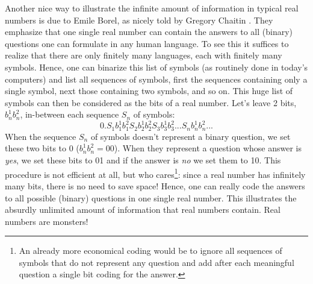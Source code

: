 \documentclass[pra,aps,groupedaddress,twocolumn,floatfix,nofootinbib]{revtex4}
\newcommand{\beq}{\begin{equation}}
\newcommand{\eeq}{\end{equation}}
\begin{document}
Another nice way to illustrate the infinite amount of information in typical real numbers is due to Emile Borel, as nicely told by Gregory Chaitin \cite{Chaitin}. They emphasize that one single real number can contain the answers to all (binary) questions one can formulate in any human language. To see this it suffices to realize that there are only finitely many languages, each with finitely many symbols. Hence,  one can binarize this list of symbols (as routinely done in today's computers) and list all sequences of symbols, first the sequences containing only a single symbol, next those containing two symbols, and so on. This huge list of symbols can then be considered as the bits of a real number. Let's leave 2 bits, $b_n^1b_n^2$, in-between each sequence $S_n$ of symbols:
\beq
0.S_1b_1^1b_1^2S_2b_2^1b_2^2S_3b_3^1b_3^2...S_nb_n^1b_n^2...
\eeq
When the sequence $S_n$ of symbols doesn't represent a binary question, we set these two bits to 0 ($b_n^1b_n^2=00$). When they represent a question whose answer is {\it yes}, we set these bits to 01 and if the answer is {\it no} we set them to 10. This procedure is not efficient at all, but who cares\footnote{An already more economical coding would be to ignore all sequences of symbols that do not represent any question and add after each meaningful question a single bit coding for the answer.}: since a real number has infinitely many bits, there is no need to save space! Hence, one can really code the answers to all possible (binary) questions in one single real number. This illustrates the absurdly unlimited amount of information that real numbers contain. Real numbers are monsters!
\end{document}
